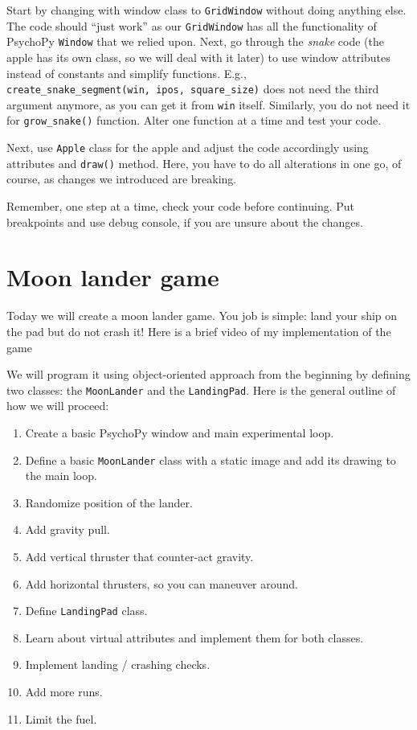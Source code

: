 \documentclass[
]{book}
\providecommand{\tightlist}{%
  \setlength{\itemsep}{0pt}\setlength{\parskip}{0pt}}
\begin{document}
Start by changing with window class to \texttt{GridWindow} without doing anything else. The code should ``just work'' as our \texttt{GridWindow} has all the functionality of PsychoPy \texttt{Window} that we relied upon. Next, go through the \emph{snake} code (the apple has its own class, so we will deal with it later) to use window attributes instead of constants and simplify functions. E.g., \texttt{create\_snake\_segment(win,\ ipos,\ square\_size)} does not need the third argument anymore, as you can get it from \texttt{win} itself. Similarly, you do not need it for \texttt{grow\_snake()} function. Alter one function at a time and test your code.

Next, use \texttt{Apple} class for the apple and adjust the code accordingly using attributes and \texttt{draw()} method. Here, you have to do all alterations in one go, of course, as changes we introduced are breaking.

Remember, one step at a time, check your code before continuing. Put breakpoints and use debug console, if you are unsure about the changes.

\hypertarget{seminar-02-04}{%
\chapter{Moon lander game}\label{seminar-02-04}}

Today we will create a moon lander game. You job is simple: land your ship on the pad but do not crash it! Here is a brief video of my implementation of the game

We will program it using object-oriented approach from the beginning by defining two classes: the \texttt{MoonLander} and the \texttt{LandingPad}. Here is the general outline of how we will proceed:

\begin{enumerate}
\def\labelenumi{\arabic{enumi}.}
\tightlist
\item
  Create a basic PsychoPy window and main experimental loop.
\item
  Define a basic \texttt{MoonLander} class with a static image and add its drawing to the main loop.
\item
  Randomize position of the lander.
\item
  Add gravity pull.
\item
  Add vertical thruster that counter-act gravity.
\item
  Add horizontal thrusters, so you can maneuver around.
\item
  Define \texttt{LandingPad} class.
\item
  Learn about virtual attributes and implement them for both classes.
\item
  Implement landing / crashing checks.
\item
  Add more runs.
\item
  Limit the fuel.
\end{enumerate}
\end{document}
